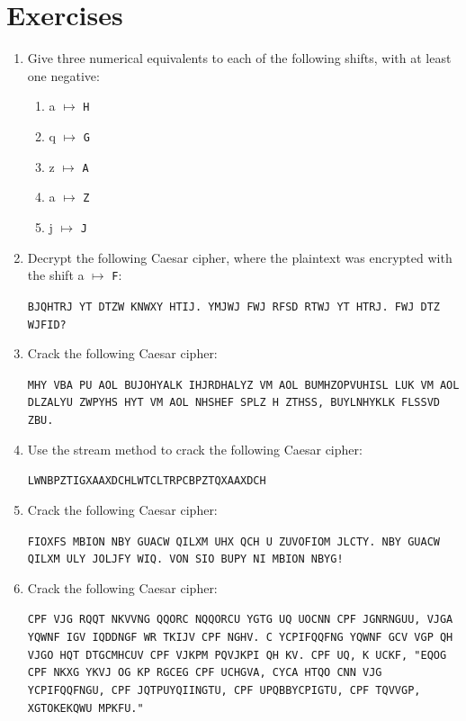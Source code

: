 \documentclass{book}
\theoremstyle{plain}
\theoremstyle{definition}
\newif\ifprintsolutions
\newcommand{\solution}[1]{\ifprintsolutions \begin{sloppypar}{\it #1}\end{sloppypar} \fi} %
\newcommand{\ciphertext}[1]{\texttt{#1}} %
\newcommand{\display}[1]{\begin{sloppypar}\setlength{\parindent}{0mm}#1\end{sloppypar}} %
\begin{document}
\section{Exercises}
\begin{enumerate}
\item Give three numerical equivalents to each of the following shifts, with at least one negative:
\begin{enumerate}
\item a $\mapsto$ \ciphertext{H} \solution{Examples are $7$ and $33$}
\item q $\mapsto$ \ciphertext{G} \solution{Examples are $16$ and $42$}
\item z $\mapsto$ \ciphertext{A} \solution{Examples are $1$ and $27$}
\item a $\mapsto$ \ciphertext{Z} \solution{Examples are $-1$ and $25$}
\item j $\mapsto$ \ciphertext{J} \solution{Examples are $0$ and $-26$}
\end{enumerate}
\item Decrypt the following Caesar cipher, where the plaintext was encrypted with the shift a $\mapsto$ \ciphertext{F}: \display{\ciphertext{BJQHTRJ YT DTZW KNWXY HTIJ. YMJWJ FWJ RFSD RTWJ YT HTRJ. FWJ DTZ WJFID?}} \solution{Welcome to your first code. There are many more to come. Are you ready?}
\item Crack the following Caesar cipher:
\display{\ciphertext{MHY VBA PU AOL BUJOHYALK IHJRDHALYZ VM AOL BUMHZOPVUHISL LUK VM AOL DLZALYU ZWPYHS HYT VM AOL NHSHEF SPLZ H ZTHSS, BUYLNHYKLK FLSSVD ZBU.}} \solution{Shift a $\mapsto$ H: Far out in the uncharted backwaters of the unfashionable end of the western spiral arm of the galaxy lies a small, unregarded yellow sun.}
\item Use the stream method to crack the following Caesar cipher:
\display{\ciphertext{LWNBPZTIGXAAXDCHLWTCLTRPCBPZTQXAAXDCH}} \solution{Shift a $\mapsto$ P: why make trillions when we can make billions}
\item Crack the following Caesar cipher:
\display{\ciphertext{FIOXFS MBION NBY GUACW QILXM UHX QCH U ZUVOFIOM JLCTY. NBY GUACW QILXM ULY JOLJFY WIQ. VON SIO BUPY NI MBION NBYG!}} \solution{Shift a $\mapsto$ U: Loudly shout the magic words and win a fabulous prize. The magic words are purple cow. But you have to shout them!}
\item Crack the following Caesar cipher:
\display{\ciphertext{CPF VJG RQQT NKVVNG QQORC NQQORCU YGTG UQ UOCNN CPF JGNRNGUU, VJGA YQWNF IGV IQDDNGF WR TKIJV CPF NGHV. C YCPIFQQFNG YQWNF GCV VGP QH VJGO HQT DTGCMHCUV CPF VJKPM PQVJKPI QH KV. CPF UQ, K UCKF, "EQOG CPF NKXG YKVJ OG KP RGCEG CPF UCHGVA, CYCA HTQO CNN VJG YCPIFQQFNGU, CPF JQTPUYQIINGTU, CPF UPQBBYCPIGTU, CPF TQVVGP, XGTOKEKQWU MPKFU."}} \solution{Shift a $\mapsto$ C: And the poor little oompa loompas were so small and helpless, they would get gobbled up right and left. A wangdoodle would eat ten of them for breakfast and think nothing of it. And so, I said, ``Come and live with me in peace and safety, away from all the wangdoodles, and hornswogglers, and snozzwangers, and rotten, vermicious knids."}

\end{enumerate}
\end{document}
